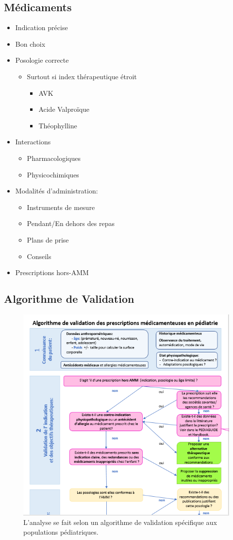 \documentclass[11pt]{article}
\begin{document}
\subsection{Médicaments}
\label{sec:org3fa00f6}
\begin{itemize}
\item Indication précise
\item Bon choix
\item Posologie correcte
\begin{itemize}
\item Surtout si index thérapeutique étroit
\begin{itemize}
\item AVK
\item Acide Valproïque
\item Théophylline
\end{itemize}
\end{itemize}
\item Interactions
\begin{itemize}
\item Pharmacologiques
\item Physicochimiques
\end{itemize}
\item Modalités d'administration:
\begin{itemize}
\item Instruments de mesure
\item Pendant/En dehors des repas
\item Plans de prise
\item Conseils
\end{itemize}
\item Prescriptions hors-AMM
\end{itemize}
\subsection{Algorithme de Validation}
\label{sec:org589ae46}
\begin{figure}[htbp]
\centering
\includegraphics[width=.9\linewidth]{./pedia_validation2.png}
\caption{L'analyse se fait selon un algorithme de validation spécifique aux populations pédiatriques.}
\end{figure}
\end{document}
